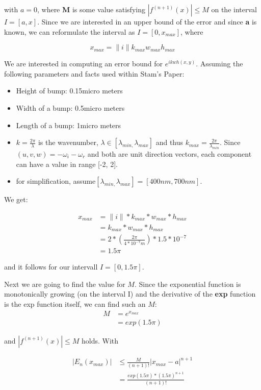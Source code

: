 with $a=0$, where \textbf{M} is some value satisfying $|f^{(n+1)}(x)|\leq M$ on the interval $I=[a,x]$. Since we are interested in an upper bound of the error and since \textbf{a} is known, we can reformulate the interval as $I=[0,x_{max}]$, where 

\begin{equation*}
 x_{max} = \|i\| k_{max} w_{max} h_{max}
\end{equation*}

We are interested in computing an error bound for $e^{ikwh(x,y)}$. Assuming the following parameters and facts used within Stam's Paper: 

\begin{itemize}
\item Height of bump: 0.15micro meters
\item Width of a bump: 0.5micro meters
\item Length of a bump: 1micro meters
\item $k=\frac{2\pi}{\lambda}$ is the wavenumber, $\lambda\in[\lambda_{min,}\lambda_{max}]$ and
thus $k_{max}=\frac{2\pi}{\lambda_{min}}$. Since $(u,v,w) = -\omega_i - \omega_r$ and both are unit direction vectors, 
each component can have a value in range {[}-2, 2{]}.
\item for simplification, assume$[\lambda_{min,}\lambda_{max}]=[400nm,700nm].$

\end{itemize}

We get:  

\begin{align*}
x_{max}
 &= \|i\|*k_{max}*w_{max}*h_{max} \\
 &= k_{max}*w_{max}*h_{max} \\
 &=2*(\frac{2\pi}{4*10^{-7}m})*1.5*10^{-7} \\
 &=1.5\pi
\end{align*}

and it follows for our intervall $I=[0,1.5\pi]$. 

Next we are going to find the value for $M$. Since the exponential function is monotonically growing (on the interval I) and the derivative of the \textbf{exp} function is the exp function itself, we can find such an $M$: 
\begin{align*}
 M
 &=e^{x_{max}} \\
 &=exp(1.5\pi)
\end{align*}

and $|f^{(n+1)}(x)|\leq M$ holds. With 

\begin{align*}
|E_{n}(x_{max})|
 &\leq\frac{M}{(n+1)!}|x_{max}-a|^{n+1} \\
 &= \frac{exp(1.5\pi)*(1.5\pi)^{n+1}}{(n+1)!}
\end{align*}

